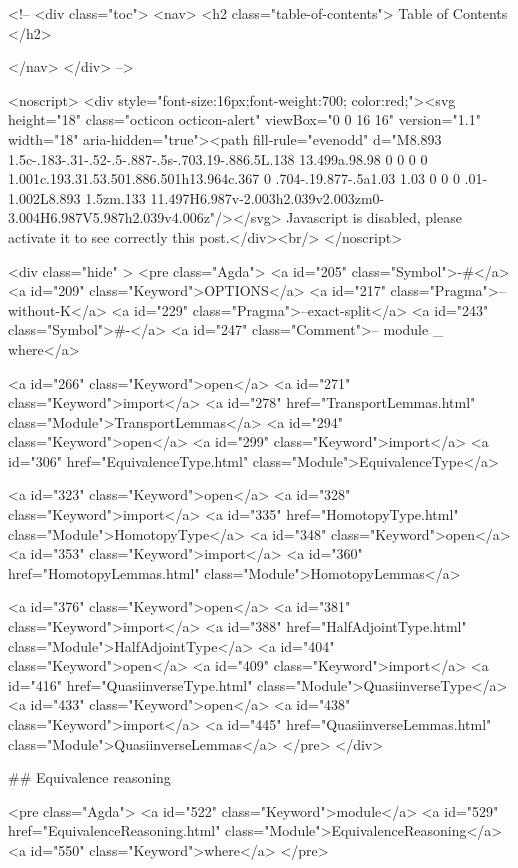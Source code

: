  <!-- 
  <div class="toc">
    <nav>
    <h2 class="table-of-contents"> Table of Contents </h2>
      

    </nav>
  </div>
   -->

  <noscript>
  <div style="font-size:16px;font-weight:700; color:red;"><svg height="18" class="octicon octicon-alert" viewBox="0 0 16 16" version="1.1" width="18" aria-hidden="true"><path fill-rule="evenodd" d="M8.893 1.5c-.183-.31-.52-.5-.887-.5s-.703.19-.886.5L.138 13.499a.98.98 0 0 0 0 1.001c.193.31.53.501.886.501h13.964c.367 0 .704-.19.877-.5a1.03 1.03 0 0 0 .01-1.002L8.893 1.5zm.133 11.497H6.987v-2.003h2.039v2.003zm0-3.004H6.987V5.987h2.039v4.006z"/></svg> Javascript is disabled, please activate it to see correctly this post.</div><br/>
  </noscript>

  <div class="hide" >
<pre class="Agda">
<a id="205" class="Symbol">{-#</a> <a id="209" class="Keyword">OPTIONS</a> <a id="217" class="Pragma">--without-K</a> <a id="229" class="Pragma">--exact-split</a> <a id="243" class="Symbol">#-}</a>
<a id="247" class="Comment">-- module _ where</a>

<a id="266" class="Keyword">open</a> <a id="271" class="Keyword">import</a> <a id="278" href="TransportLemmas.html" class="Module">TransportLemmas</a>
<a id="294" class="Keyword">open</a> <a id="299" class="Keyword">import</a> <a id="306" href="EquivalenceType.html" class="Module">EquivalenceType</a>

<a id="323" class="Keyword">open</a> <a id="328" class="Keyword">import</a> <a id="335" href="HomotopyType.html" class="Module">HomotopyType</a>
<a id="348" class="Keyword">open</a> <a id="353" class="Keyword">import</a> <a id="360" href="HomotopyLemmas.html" class="Module">HomotopyLemmas</a>

<a id="376" class="Keyword">open</a> <a id="381" class="Keyword">import</a> <a id="388" href="HalfAdjointType.html" class="Module">HalfAdjointType</a>
<a id="404" class="Keyword">open</a> <a id="409" class="Keyword">import</a> <a id="416" href="QuasiinverseType.html" class="Module">QuasiinverseType</a>
<a id="433" class="Keyword">open</a> <a id="438" class="Keyword">import</a> <a id="445" href="QuasiinverseLemmas.html" class="Module">QuasiinverseLemmas</a>
</pre>
</div>

## Equivalence reasoning

<pre class="Agda">
<a id="522" class="Keyword">module</a> <a id="529" href="EquivalenceReasoning.html" class="Module">EquivalenceReasoning</a> <a id="550" class="Keyword">where</a>
</pre>

